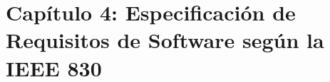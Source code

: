 
\newpage
\section{Capítulo 4: Especificación de Requisitos de Software según la IEEE 830}\label{cap:ieee830}





